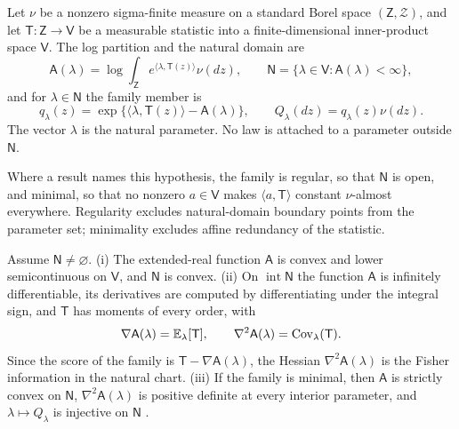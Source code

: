 Let \(\nu\) be a nonzero sigma-finite measure on a standard Borel space
\((\mathsf Z,\mathscr Z)\), and let \(\mathsf T:\mathsf Z\to\mathsf V\) be a
measurable statistic into a finite-dimensional inner-product space
\(\mathsf V\). The log partition and the natural domain are
\begin{equation}
\mathsf A(\lambda)
=\log\int_{\mathsf Z}e^{\langle\lambda,\mathsf T(z)\rangle}\nu(dz),
\qquad
\mathsf N=\{\lambda\in\mathsf V:\mathsf A(\lambda)<\infty\},
\label{eq:exp-logpartition}
\end{equation}
and for \(\lambda\in\mathsf N\) the family member is
\begin{equation}
q_\lambda(z)
=\exp\{\langle\lambda,\mathsf T(z)\rangle-\mathsf A(\lambda)\},
\qquad
Q_\lambda(dz)=q_\lambda(z)\nu(dz).
\label{eq:exp-density}
\end{equation}
The vector \(\lambda\) is the natural parameter. No law is attached to a
parameter outside \(\mathsf N\).

Where a result names this hypothesis, the family is regular, so that
\(\mathsf N\) is open, and minimal, so that no nonzero \(a\in\mathsf V\) makes
\(\langle a,\mathsf T\rangle\) constant \(\nu\)-almost everywhere. Regularity
excludes natural-domain boundary points from the parameter set; minimality
excludes affine redundancy of the statistic.

Assume \(\mathsf N\neq\varnothing\). (i) The extended-real function
\(\mathsf A\) is convex and lower semicontinuous on \(\mathsf V\), and
\(\mathsf N\) is convex. (ii) On \(\operatorname{int}\mathsf N\) the function
\(\mathsf A\) is infinitely differentiable, its derivatives are computed by
differentiating under the integral sign, and \(\mathsf T\) has moments of
every order, with
\begin{equation}
\nabla\mathsf A(\lambda)=\mathbb E_\lambda[\mathsf T],
\qquad
\nabla^2\mathsf A(\lambda)=\operatorname{Cov}_\lambda(\mathsf T).
\label{eq:exp-cumulants}
\end{equation}
Since the score of the family is \(\mathsf T-\nabla\mathsf A(\lambda)\), the
Hessian \(\nabla^2\mathsf A(\lambda)\) is the Fisher information in the
natural chart. (iii) If the family is minimal, then \(\mathsf A\) is strictly
convex on \(\mathsf N\), \(\nabla^2\mathsf A(\lambda)\) is positive definite at
every interior parameter, and \(\lambda\mapsto Q_\lambda\) is injective on
\(\mathsf N\) \citep[Theorems~7.1, 7.2 and~8.1 and Section~8.1]{BarndorffNielsen1978}.

